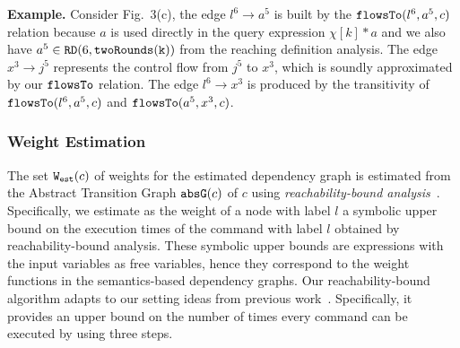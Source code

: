 \textbf{Example.}
Consider Fig.~3(c),  
the edge $l^6 \to a^5$ is built by the $\mathtt{flowsTo}(l^6, a^5, c)$ relation because
$a$ is used directly in the query expression $\chi[k]*a$
and we also have $a^5 \in \mathtt{RD}(6, \mathtt{twoRounds(k)})$ from the reaching definition analysis.
The edge $x^3 \to j^5$  represents the control flow from $j^5$ to $x^3$, which is soundly approximated by our $\mathtt{flowsTo}$ relation.
The edge $l^6 \to x^3$ is produced by the transitivity of $\mathtt{flowsTo}(l^6, a^5, c)$ and $\mathtt{flowsTo}(a^5, x^3, c)$. 

\subsubsection{Weight Estimation}
\label{sec:alg_weightgen}
The set $\mathtt{{W_{est}}}(c)$ of weights for the estimated dependency graph is estimated from the Abstract Transition Graph $\mathtt{abs}{\mathtt{G}}(c)$ of $c$ using \emph{reachability-bound analysis}~\cite{GulwaniZ10}. Specifically, we estimate as the weight of a node with label $l$ a symbolic upper bound on the execution times of the command with label $l$ obtained by reachability-bound analysis. These symbolic upper bounds are expressions with the input variables as free variables, hence they correspond to the weight functions in the semantics-based dependency graphs. 
Our reachability-bound algorithm adapts to our setting ideas from previous work~\cite{ZulegerGSV11,SinnZV14,sinn2017complexity}.
Specifically, it provides an upper bound on the number of times every command can be executed by using three steps.
